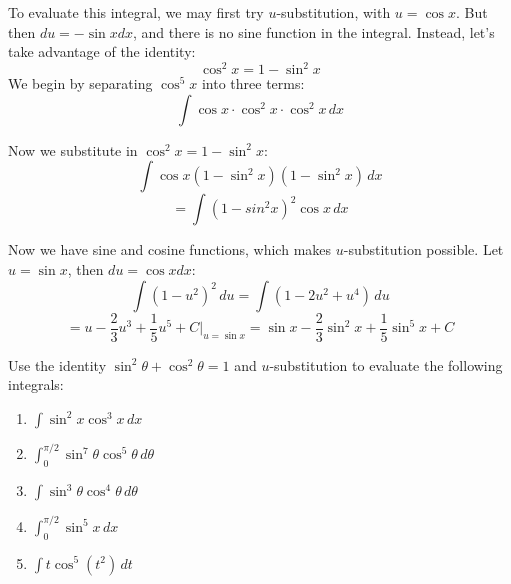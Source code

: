 To evaluate this integral, we may first try $u$-substitution, with $u = \cos{x}
$. But then $du = -\sin{x} dx$, and there is no sine function in the integral. 
Instead, let's take advantage of the identity:
$$\cos^2{x} = 1 - \sin^2{x}$$
We begin by separating $\cos^5{x}$ into three terms:
$$\int \cos{x} \cdot \cos^2{x} \cdot \cos^2{x}\,dx$$

Now we substitute in $\cos^2{x} = 1 - \sin^2{x}$:
$$\int \cos{x} \left( 1 - \sin^2{x} \right) \left( 1 - \sin^2{x} \right)\,dx$$
$$= \int \left( 1 - sin^2{x} \right)^2 \cos{x} \,dx$$

Now we have sine and cosine functions, which makes $u$-substitution possible. 
Let $u = \sin{x}$, then $du = \cos{x} dx$:
$$\int \left( 1 - u^2 \right)^2\,du = \int \left( 1 - 2u^2 + u^4 \right)\,du$$
$$= u - \frac{2}{3}u^3 + \frac{1}{5}u^5 + C|_{u = \sin{x}} = \sin{x} - \frac{
2}{3}\sin^2{x} + \frac{1}{5}\sin^5{x} + C$$

\begin{Exercise}[title = {Integrating odd powers of sine and cosine}, 
label = power_1]
Use the identity $\sin^2{\theta} + \cos^2{\theta} = 1$ and $u$-substitution to 
evaluate the following integrals:
\begin{enumerate}
\item $\int \sin^2{x} \cos^3{x}\,dx$
\item $\int_0^{\pi/2} \sin^7{\theta} \cos^5{\theta}\,d\theta$
\item $\int \sin^3{\theta} \cos^4{\theta}\,d\theta$
\item $\int_0^{\pi/2} \sin^5{x}\,dx$
\item $\int t \cos^5{\left( t^2 \right)}\,dt$
\end{enumerate}
\end{Exercise}

